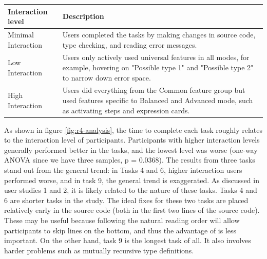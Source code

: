 \begin{tabularx}{\linewidth}{ 
  | >{\raggedright\arraybackslash}X 
  | >{\raggedright\arraybackslash}X  | }

    \hline
        Interaction level & Description \\ \hline
        Minimal Interaction & Users completed the tasks by making changes in source code, type checking, and reading error messages. \\ \hline
        Low Interaction & Users only actively used universal features in all modes, for example, hovering on "Possible type 1" and "Possible type 2" to narrow down error space. \\ \hline
        High Interaction & Users did everything from the Common feature group but used features specific to Balanced and Advanced mode, such as activating steps and expression cards. \\ \hline

\end{tabularx}



As shown in  figure \ref{fig:r4-analysis}, the time to complete each task roughly relates to the interaction level of participants. Participants with higher interaction levels generally performed better in the tasks, and the lowest level was worse (one-way ANOVA since we have three samples, p = 0.0368). The results from three tasks stand out from the general trend: in Tasks 4 and 6, higher interaction users performed worse, and in task 9, the general trend is exaggerated. As discussed in user studies 1 and 2, it is likely related to the nature of these tasks. Tasks 4 and 6 are shorter tasks in the study. The ideal fixes for these two tasks are placed relatively early in the source code (both in the first two lines of the source code). These may be useful because following the natural reading order will allow participants to skip lines on the bottom, and thus the advantage of \chameleon{} is less important. On the other hand, task 9 is the longest task of all. It also involves harder problems such as mutually recursive type definitions.

